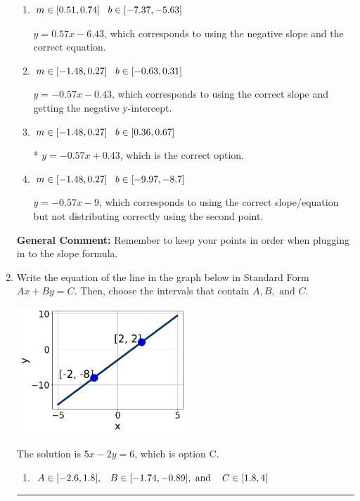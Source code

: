 \documentclass{extbook}[14pt]
\newcommand{\litem}[1]{\item #1

\rule{\textwidth}{0.4pt}}
\begin{document}
\begin{enumerate}
{\begin{enumerate}[label=\Alph*.]
 $y = -0.57x + 13$, which corresponds to using the correct slope/equation but not distributing correctly using the first point.
\item \( m \in [0.51, 0.74] \hspace*{3mm} b \in [-7.37, -5.63] \)

 $y = 0.57x -6.43$, which corresponds to using the negative slope and the correct equation.
\item \( m \in [-1.48, 0.27] \hspace*{3mm} b \in [-0.63, 0.31] \)

 $y = -0.57x -0.43$, which corresponds to using the correct slope and getting the negative y-intercept.
\item \( m \in [-1.48, 0.27] \hspace*{3mm} b \in [0.36, 0.67] \)

* $y = -0.57x + 0.43$, which is the correct option.
\item \( m \in [-1.48, 0.27] \hspace*{3mm} b \in [-9.97, -8.7] \)

 $y = -0.57x -9$, which corresponds to using the correct slope/equation but not distributing correctly using the second point.
\end{enumerate}

\textbf{General Comment:} Remember to keep your points in order when plugging in to the slope formula.
}
\litem{
Write the equation of the line in the graph below in Standard Form $Ax+By=C$. Then, choose the intervals that contain $A, B, \text{ and } C$.

\begin{center}
    \includegraphics[width=0.5\textwidth]{../Figures/linearGraphToStandardB.png}
\end{center}


The solution is \( 5x - 2y = 6 \), which is option C.\begin{enumerate}[label=\Alph*.]
\item \( A \in [-2.6, 1.8], \hspace{3mm} B \in [-1.74, -0.89], \text{ and } \hspace{3mm} C \in [1.8, 4] \)


\end{enumerate}}
\end{enumerate}
\end{document}
